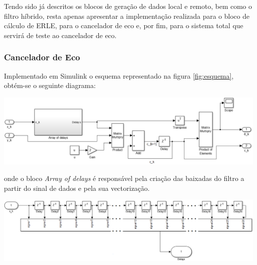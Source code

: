\documentclass[a4paper,11pt]{report}
\begin{document}
Tendo sido já descritos os blocos de geração de dados local e remoto, bem como o filtro híbrido, resta apenas apresentar a implementação realizada para o bloco de cálculo de ERLE, para o cancelador de eco e, por fim, para o sistema total que servirá de teste ao cancelador de eco.\\

\subsubsection{Cancelador de Eco}

Implementado em Simulink o esquema representado na figura \ref{fig:esquema}, obtém-se o seguinte diagrama:
\begin{center}
     \includegraphics[angle=0,width=1\textwidth]{cancelador.png}
     \label{fig:cancelador}
     \end{center}

onde o bloco \emph{Array of delays} é responsável pela criação das baixadas do filtro a partir do sinal de dados e pela sua vectorização.

\begin{center}
     \includegraphics[angle=0,width=1.1\textwidth]{delays.png}
     \label{fig:delays}
     \end{center}
\end{document}
